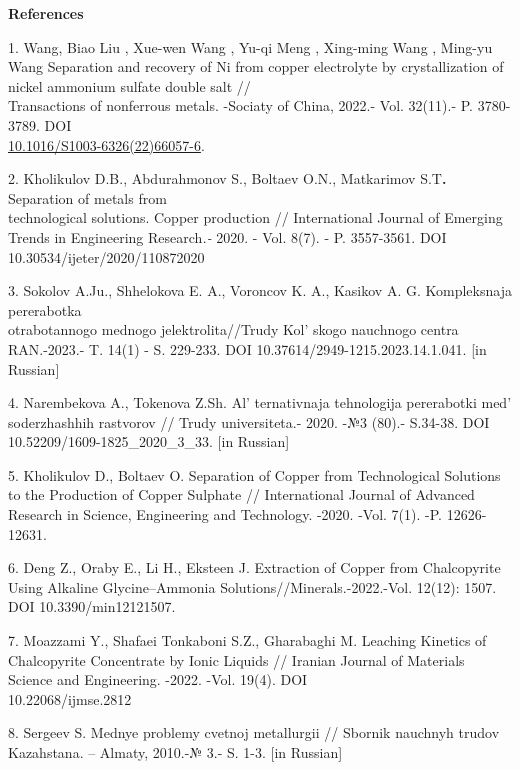 \begin{center}
{\bfseries References}
\end{center}

\begin{references}
1. Wang, Biao Liu , Xue-wen Wang , Yu-qi Meng , Xing-ming Wang , Ming-yu
Wang Separation and recovery of Ni from copper electrolyte by
crystallization of nickel ammonium sulfate double salt // \\Transactions
of nonferrous metals. -Sociaty of China, 2022.- Vol. 32(11).- P.
3780-3789. DOI\\
\href{http://dx.doi.org/10.1016/S1003-6326(22)66057-6}{10.1016/S1003-6326(22)66057-6}.

2. Kholikulov D.B., Abdurahmonov S., Boltaev O.N., Matkarimov
S.T{\bfseries .} Separation of metals from \\technological solutions.
Copper production // International Journal of Emerging Trends in
Engineering Research\emph{.-} 2020. - Vol. 8(7). - P. 3557-3561. DOI
10.30534/ijeter/2020/110872020

3. Sokolov A.Ju., Shhelokova E. A., Voroncov K. A., Kasikov A. G.
Kompleksnaja pererabotka \\otrabotannogo mednogo jelektrolita//Trudy
Kol' skogo nauchnogo centra RAN.-2023.- T. 14(1) - S.
229-233. DOI 10.37614/2949-1215.2023.14.1.041. {[}in Russian{]}

4. Narembekova A., Tokenova Z.Sh. Al' ternativnaja
tehnologija pererabotki med' soderzhashhih
rastvorov // Trudy universiteta.- 2020. -№3 (80).- S.34-38. DOI
10.52209/1609-1825\_2020\_3\_33. {[}in Russian{]}

5. Kholikulov D., Boltaev O. Separation of Copper from Technological
Solutions to the Production of Copper Sulphate // International Journal
of Advanced Research in Science, Engineering and Technology. -2020.
-Vol. 7(1). -P. 12626-12631.

6. Deng Z., Oraby E., Li H., Eksteen J. Extraction of Copper from
Chalcopyrite Using Alkaline Glycine--Ammonia
Solutions//Minerals.-2022.-Vol. 12(12): 1507. DOI 10.3390/min12121507.

7. Moazzami Y., Shafaei Tonkaboni S.Z., Gharabaghi M. Leaching Kinetics
of Chalcopyrite Concentrate by Ionic Liquids // Iranian Journal of
Materials Science and Engineering. -2022. -Vol. 19(4). DOI\\
10.22068/ijmse.2812

8. Sergeev S. Mednye problemy cvetnoj metallurgii // Sbornik nauchnyh
trudov Kazahstana. -- Almaty, 2010.-№ 3.- S. 1-3. {[}in Russian{]}


\end{references}
